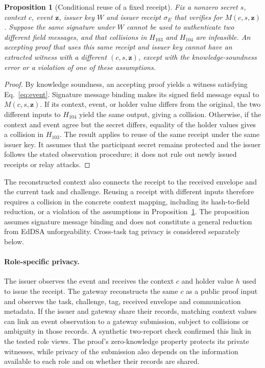 \documentclass[pdflatex,iicol,sn-mathphys-num]{sn-jnl}
\newtheorem{proposition}{Proposition}
\begin{document}
\begin{proposition}[Conditional reuse of a fixed receipt]\label{prop:receipt-binding}
Fix a nonzero secret $s$, context $c$, event $\boldsymbol z$, issuer key $W$ and issuer receipt $\sigma_E$ that verifies for $M(c,s,\boldsymbol z)$. Suppose the same signature under $W$ cannot be used to authenticate two different field messages, and that collisions in $H_{103}$ and $H_{104}$ are infeasible. An accepting proof that uses this same receipt and issuer key cannot have an extracted witness with a different $(c,s,\boldsymbol z)$, except with the knowledge-soundness error or a violation of one of these assumptions.
\end{proposition}
\begin{proof}
By knowledge soundness, an accepting proof yields a witness satisfying Eq.~\eqref{eq:event}. Signature message binding makes its signed field message equal to $M(c,s,\boldsymbol z)$. If its context, event, or holder value differs from the original, the two different inputs to $H_{104}$ yield the same output, giving a collision. Otherwise, if the context and event agree but the secret differs, equality of the holder values gives a collision in $H_{103}$. The result applies to reuse of the same receipt under the same issuer key. It assumes that the participant secret remains protected and the issuer follows the stated observation procedure; it does not rule out newly issued receipts or relay attacks.
\end{proof}

The reconstructed context also connects the receipt to the received envelope and the current task and challenge. Reusing a receipt with different inputs therefore requires a collision in the concrete context mapping, including its hash-to-field reduction, or a violation of the assumptions in Proposition~\ref{prop:receipt-binding}. The proposition assumes signature message binding and does not constitute a general reduction from EdDSA unforgeability. Cross-task tag privacy is considered separately below.

\paragraph{Role-specific privacy.} The issuer observes the event and receives the context $c$ and holder value $h$ used to issue the receipt. The gateway reconstructs the same $c$ as a public proof input and observes the task, challenge, tag, received envelope and communication metadata. If the issuer and gateway share their records, matching context values can link an event observation to a gateway submission, subject to collisions or ambiguity in those records. A synthetic two-report check confirmed this link in the tested role views. The proof's zero-knowledge property protects its private witnesses, while privacy of the submission also depends on the information available to each role and on whether their records are shared.
\end{document}
